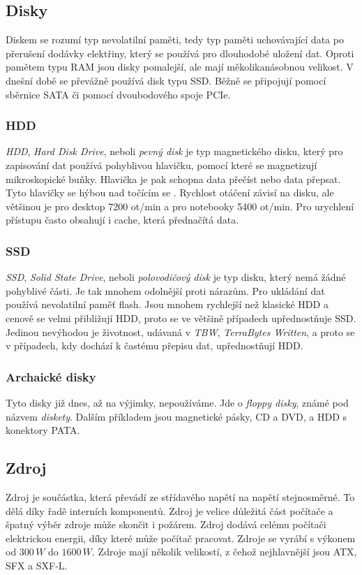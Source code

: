 \documentclass[a4paper]{article}
\begin{document}
    \subsection{Disky}
        Diskem se rozumí typ nevolatilní paměti, tedy typ paměti uchovávající data po přerušení dodávky elektřiny, který se používá pro dlouhodobé uložení dat. Oproti pamětem typu RAM jsou disky pomalejší, ale mají měkolikanásobnou velikost. V dnešní době se převážně používá disk typu SSD. Běžně se připojují pomocí sběrnice SATA či pomocí dvoubodového spoje PCIe.
        \subsubsection{HDD}
            \textit{HDD}, \textit{Hard Disk Drive}, neboli \textit{pevný disk} je typ magnetického disku, který pro zapisování dat používá pohyblivou hlavičku, pomocí které se magnetizují mikroskopické buňky. Hlavička je pak schopna data přečíst nebo data přepsat. Tyto hlavičky se hýbou nad točícím se . Rychlost otáčení závisí na disku, ale většinou je pro desktop 7200 ot/min a pro notebooky 5400 ot/min. Pro urychlení přístupu často obsahují i cache, která přednačítá data.
        \subsubsection{SSD}
            \textit{SSD}, \textit{Solid State Drive}, neboli \textit{polovodičový disk} je typ disku, který nemá žádné pohyblivé části. Je tak mnohem odolnější proti nárazům. Pro ukládání dat používá nevolatilní paměť flash. Jsou mnohem rychlejší než klasické HDD a cenově se velmi přibližují HDD, proto se ve většině případech upřednostňuje SSD. Jedinou nevýhodou je životnost, udávaná v \textit{TBW}, \textit{TerraBytes Written}, a proto se v případech, kdy dochází k častému přepisu dat, upřednostňují HDD.
        \subsubsection{Archaické disky}
            Tyto disky již dnes, až na výjimky, nepoužíváme. Jde o \textit{floppy disky}, známé pod názvem \textit{diskety}. Dalším příkladem jsou magnetické pásky, CD a DVD, a HDD s konektory PATA.
    \subsection{Zdroj}
        Zdroj je součástka, která převádí ze střídavého napětí na napětí stejnosměrné. To dělá díky řadě interních komponentů. Zdroj je velice důležitá část počítače a špatný výběr zdroje může skončit i požárem. Zdroj  dodává celému počítači elektrickou energii, díky které může počítač pracovat. Zdroje se vyrábí s výkonem od $300\,W$ do $1600\,W$. Zdroje mají několik velikostí, z čehož nejhlavnější jsou ATX, SFX a SXF-L.
\end{document}
